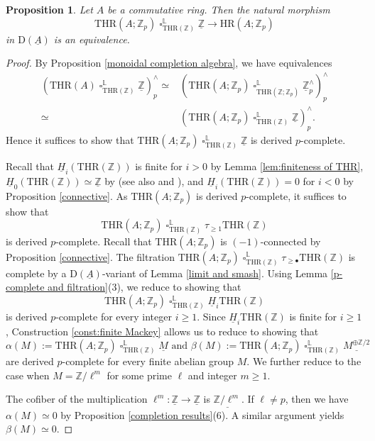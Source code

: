 \documentclass[10pt]{amsart}
\newtheorem{prop}[thm]{Proposition}
\theoremstyle{definition}
\numberwithin{equation}{section}
\renewcommand{\L}{\mathbb{L}}
\newcommand{\Z}{\mathbb{Z}}
\newcommand{\rD}{\mathrm{D}}
\newcommand{\ul}{\underline}
\DeclareMathOperator{\sotimes}{\square}
\newcommand{\HR}{\mathrm{HR}}
\newcommand{\THR}{\mathrm{THR}}
\begin{document}
\begin{prop}
\label{prop:hrcompleted}
Let $A$ be a commutative ring.
Then the natural morphism
\[
\THR(A;\Z_p)
\sotimes_{\THR(\Z)}^\L
\ul{\Z}
\to
\HR(A;\Z_p)
\]
in $\rD(\ul{A})$ is an equivalence.
\end{prop}
\begin{proof}
By Proposition \ref{monoidal completion algebra},
we have equivalences
\begin{align*}
(\THR(A)\sotimes_{\THR(\Z)}^\L \ul{\Z})_p^\wedge
\simeq &
(\THR(A;\Z_p)\sotimes_{\THR(\Z;\Z_p)}^\L \ul{\Z}_p^\wedge)_p^\wedge
\\
\simeq &
(\THR(A;\Z_p)\sotimes_{\THR(\Z)}^\L \ul{\Z})_p^\wedge.
\end{align*}
Hence
it suffices to show that
\(
\THR(A;\Z_p)
\sotimes_{\THR(\Z)}^\L
\ul{\Z}
\)
is derived $p$-complete.

Recall that $\ul{H}_i(\THR(\Z))$ is finite for $i>0$ by Lemma \ref{lem:finiteness of THR},
$\ul{H}_0(\THR(\Z))\simeq \ul{\Z}$ by
\cite[Theorem 5.1]{DMPR21} (see also 
\cite[Proposition 2.3.5]{HP23} and \cite{HP23erratum}),
and $\ul{H}_i(\THR(\Z))=0$ for $i<0$ by Proposition \ref{connective}.
As $\THR(A;\Z_p)$ is derived $p$-complete,
it suffices to show that
\[
\THR(A;\Z_p)
\sotimes_{\THR(\Z)}^\L
\tau_{\geq 1}\THR(\Z)
\]
is derived $p$-complete.
Recall that $\THR(A;\Z_p)$ is $(-1)$-connected by Proposition \ref{connective}.
The filtration
\(
\THR(A;\Z_p)\sotimes_{\THR(\Z)}^\L \tau_{\geq \bullet} \THR(\Z)
\)
is complete by a $\rD(\ul{A})$-variant of Lemma \ref{limit and smash}.
Using Lemma \ref{p-complete and filtration}(3),
we reduce to showing that
\[
\THR(A;\Z_p)\sotimes_{\THR(\Z)}^\L \ul{H}_i \THR(\Z)
\]
is derived $p$-complete for every integer $i\geq 1$.
Since $\ul{H}_i \THR(\Z)$ is finite for $i\geq 1$,
Construction \ref{const:finite Mackey} allows us to reduce to showing that
\[
\alpha(M):=
\THR(A;\Z_p)\sotimes_{\THR(\Z)}^\L  \ul{M}
\text{ and }
\beta(M):=
\THR(A;\Z_p)\sotimes_{\THR(\Z)}^\L  \ul{M^{\oplus \Z/2}}
\]
are derived $p$-complete for every finite abelian group $M$.
We further reduce to the case when $M=\Z/\ell^m$ for some prime $\ell$ and integer $m\geq 1$.

The cofiber of the multiplication $\ell^m\colon \ul{\Z}\to \ul{\Z}$ is $\ul{\Z/\ell^m}$.
If $\ell\neq p$,
then we have $\alpha(M)\simeq 0$ by Proposition \ref{completion results}(6). A similar argument yields $\beta(M)\simeq 0$.


\end{proof}
\end{document}
